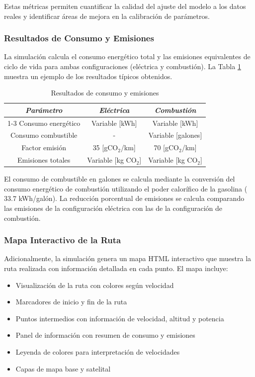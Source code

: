 Estas métricas permiten cuantificar la calidad del ajuste del modelo a los datos reales y identificar áreas de mejora en la calibración de parámetros.

\subsubsection{Resultados de Consumo y Emisiones}

La simulación calcula el consumo energético total y las emisiones equivalentes de ciclo de vida para ambas configuraciones (eléctrica y combustión). La Tabla \ref{tab:resultados_consumo} muestra un ejemplo de los resultados típicos obtenidos.

\begin{table}[htbp]
\caption{Resultados de consumo y emisiones}
\begin{center}
\begin{tabular}{|c|c|c|}
\hline
\textbf{\textit{Parámetro}} & \textbf{\textit{Eléctrica}} & \textbf{\textit{Combustión}}\\
\cline{1-3} 
\hline
Consumo energético & Variable [kWh] & Variable [kWh] \\
Consumo combustible & - & Variable [galones] \\
Factor emisión & 35 [gCO$_2$/km] & 70 [gCO$_2$/km] \\
Emisiones totales & Variable [kg CO$_2$] & Variable [kg CO$_2$] \\
\hline
\end{tabular}
\label{tab:resultados_consumo}
\end{center}
\end{table}

El consumo de combustible en galones se calcula mediante la conversión del consumo energético de combustión utilizando el poder calorífico de la gasolina ($33.7$ kWh/galón). La reducción porcentual de emisiones se calcula comparando las emisiones de la configuración eléctrica con las de la configuración de combustión.

\subsubsection{Mapa Interactivo de la Ruta}

Adicionalmente, la simulación genera un mapa HTML interactivo que muestra la ruta realizada con información detallada en cada punto. El mapa incluye:

\begin{itemize}
    \item Visualización de la ruta con colores según velocidad
    \item Marcadores de inicio y fin de la ruta
    \item Puntos intermedios con información de velocidad, altitud y potencia
    \item Panel de información con resumen de consumo y emisiones
    \item Leyenda de colores para interpretación de velocidades
    \item Capas de mapa base y satelital
\end{itemize}

